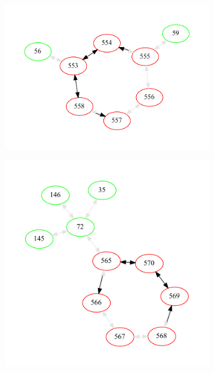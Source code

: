 \begin{figure}[H]
	\centering
	\begin{subfigure}{0.49\textwidth}
		\centering
		\includegraphics[width=0.95\linewidth]{images/tree-cycles-557.pdf}
	\end{subfigure}
	\begin{subfigure}{0.49\textwidth}
		\centering
		\includegraphics[width=0.95\linewidth]{images/tree-cycles-566.pdf}
	\end{subfigure}
	\begin{subfigure}{0.49\textwidth}
		\centering

\end{subfigure}
\end{figure}
